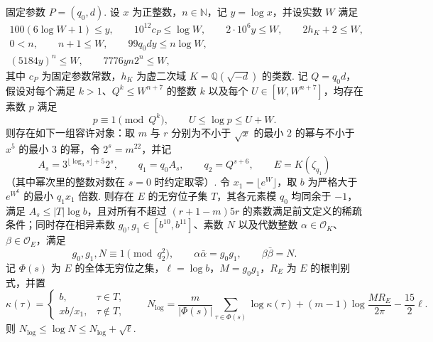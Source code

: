 \begin{lemma}[从大尺度构造容许数据]
\label{lem:admissible-construction}
\emitthmsource
固定参数 $P=(q_0,d)$. 设 $x$ 为正整数，$n\in\mathbb N$，记 $y=\log x$，并设实数 $W$ 满足
\[
\begin{gathered}
 100(6\log W+1)\le y,\qquad 10^{12}c_P\le\log W,\qquad
 2\cdot10^6y\le W,\qquad 2h_K+2\le W,\\
 0<n,\qquad n+1\le W,\qquad 99q_0dy\le n\log W,\\
 (5184y)^n\le W,\qquad 7776yn2^n\le W,
\end{gathered}
\]
其中 $c_P$ 为固定参数常数，$h_K$ 为虚二次域 $K=\mathbb Q(\sqrt{-d})$ 的类数. 记 $Q=q_0d$，假设对每个满足 $k>1$、$Q^k\le W^{n+7}$ 的整数 $k$ 以及每个 $U\in[W,W^{n+7}]$，均存在素数 $p$ 满足
\[
 p\equiv1\pmod{Q^k},\qquad U\le\log p\le U+W.
\]
则存在如下一组容许对象：取 $m$ 与 $r$ 分别为不小于 $\sqrt{x}$ 的最小 $2$ 的幂与不小于 $x^5$ 的最小 $3$ 的幂，令 $2^s=m^{22}$，并记
\[
 A_s=3^{\lfloor\log_3 s\rfloor+5}2^s,
 \qquad q_1=q_0 A_s,\qquad q_2=Q^{s+6},\qquad E=K(\zeta_{q_1})
\]
（其中幂次里的整数对数在 $s=0$ 时约定取零）. 令 $x_1=\lfloor e^W\rfloor$，取 $b$ 为严格大于 $e^{W^6}$ 的最小 $q_1x_1$ 倍数. 则存在 $E$ 的无穷位子集 $T$，其各元素模 $q_0$ 均同余于 $-1$，满足 $A_s\le |T|\log b$，且对所有不超过 $(r+1-m)5r$ 的素数满足前文定义的稀疏条件；同时存在相异素数 $g_0,g_1\in[b^{10},b^{11}]$、素数 $N$ 以及代数整数 $\alpha\in\mathcal O_K$、$\beta\in\mathcal O_E$，满足
\[
 g_0,g_1,N\equiv1\pmod{q_2^2},\qquad
 \alpha\bar\alpha=g_0g_1,\qquad \beta\bar\beta=N .
\]
记 $\Phi(s)$ 为 $E$ 的全体无穷位之集，$\ell=\log b$，$M=g_0g_1$，$R_E$ 为 $E$ 的根判别式，并置
\[
 \kappa(\tau)=
 \begin{cases}
 b,&\tau\in T,\\
 xb/x_1,&\tau\notin T,
 \end{cases}
 \qquad
 N_{\log}=\frac{m}{|\Phi(s)|}\sum_{\tau\in\Phi(s)}\log\kappa(\tau)
     +(m-1)\log\frac{MR_E}{2\pi}-\frac{15}{2}\ell .
\]
则 $N_{\log}\le\log N\le N_{\log}+\sqrt \ell$.
\end{lemma}

